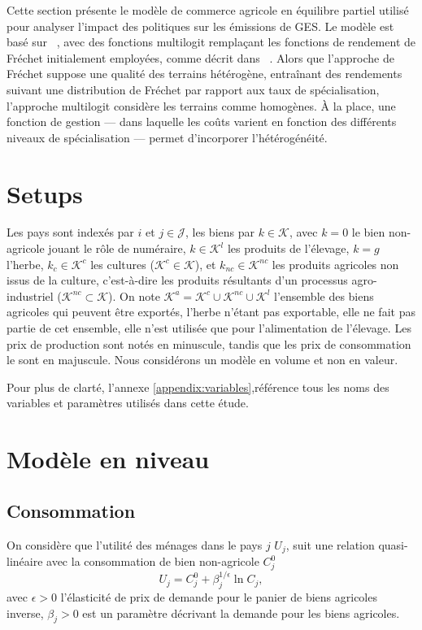 Cette section présente le modèle de commerce agricole en équilibre partiel utilisé pour analyser l’impact des politiques sur les émissions de GES. Le modèle est basé sur ~\cite{Gouel2021}, avec des fonctions multilogit remplaçant les fonctions de rendement de Fréchet initialement employées, comme décrit dans ~\cite{Gouel202x}. Alors que l’approche de Fréchet suppose une qualité des terrains hétérogène, entraînant des rendements suivant une distribution de Fréchet par rapport aux taux de spécialisation, l’approche multilogit considère les terrains comme homogènes. À la place, une fonction de gestion — dans laquelle les coûts varient en fonction des différents niveaux de spécialisation — permet d’incorporer l’hétérogénéité.


\section{Setups}

Les pays sont indexés par $i$ et $j \in \mathcal{J}$, les biens par $k \in \mathcal{K}$, avec $k=0$ le bien non-agricole jouant le rôle de numéraire, $k \in \mathcal{K}^l$ les produits de l’élevage, $k = g$ l’herbe, $k_c \in \mathcal{K}^c$ les cultures ($\mathcal{K}^c \in \mathcal{K}$), et $k_{nc} \in \mathcal{K}^{nc}$ les produits agricoles non issus de la culture, c’est-à-dire les produits résultants d’un processus agro-industriel ($\mathcal{K}^{nc} \subset \mathcal{K}$). On note $\mathcal{K}^a = \mathcal{K}^c \cup \mathcal{K}^{nc} \cup \mathcal{K}^l$ l’ensemble des biens agricoles qui peuvent être exportés, l’herbe n’étant pas exportable, elle ne fait pas partie de cet ensemble, elle n’est utilisée que pour l’alimentation de l’élevage. Les prix de production sont notés en minuscule, tandis que les prix de consommation le sont en majuscule. Nous considérons un modèle en volume et non en valeur.

Pour plus de clarté, l’annexe \ref{appendix:variables},référence tous les noms des variables et paramètres utilisés dans cette étude.

\section{Modèle en niveau}
\subsection{Consommation}

On considère que l’utilité des ménages dans le pays $j$ $U_j$, suit une relation quasi-linéaire avec la consommation de bien non-agricole $C_j^0$
\begin{equation}\label{eq_u}
    U_j = C_j^0 + \beta_j^{1/\epsilon} \ln C_j,
\end{equation}
avec $\epsilon > 0$ l’élasticité de prix de demande pour le panier de biens agricoles inverse, $\beta_j > 0$ est un paramètre décrivant la demande pour les biens agricoles.

